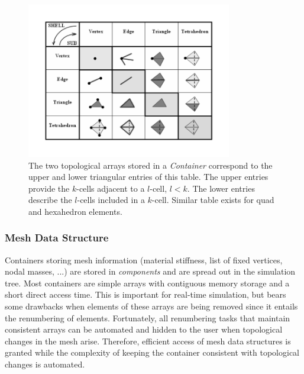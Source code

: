 \begin{figure}[ht]
    \centering
        \includegraphics[width=0.8\textwidth]{BW_Sub_Shell_Diagram}
    \caption{The two topological arrays stored in a \textit{ Container} correspond to the upper and lower triangular entries of this table. The upper entries provide the $k$-cells adjacent to a $l$-cell, $l<k$. The lower entries describe the $l$-cells included in a $k$-cell. Similar table exists for quad and hexahedron elements.}
    \label{fig:BW_Sub_Shell_Diagram}
\end{figure}

\subsubsection*{Mesh Data Structure}


Containers storing mesh information (material stiffness, list of fixed vertices, nodal masses, ...) are stored in \textit{ components} and are spread out in the simulation tree.  
Most containers are simple arrays  with contiguous memory storage and a short direct access time.
This is important for real-time simulation, but bears some drawbacks when elements of these arrays are being removed since it entails the renumbering of elements. 
Fortunately, all renumbering tasks that maintain consistent arrays can be automated and hidden to the user when topological changes in the mesh arise. 
Therefore, efficient access of  mesh data structures is granted while the complexity of keeping the container consistent with topological changes is automated.

